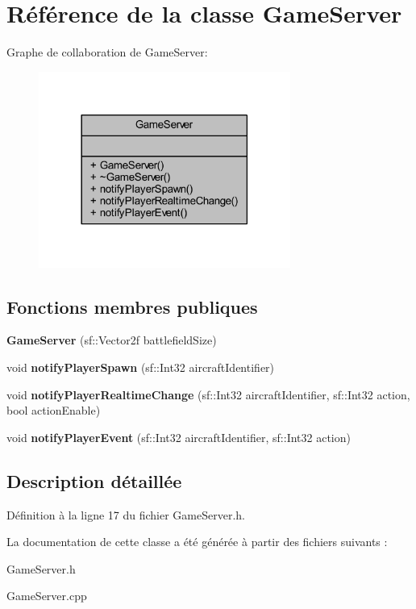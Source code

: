 \hypertarget{class_game_server}{}\section{Référence de la classe Game\+Server}
\label{class_game_server}


Graphe de collaboration de Game\+Server\+:\nopagebreak
\begin{figure}[H]
\begin{center}
\leavevmode
\includegraphics[width=234pt]{class_game_server__coll__graph}
\end{center}
\end{figure}
\subsection*{Fonctions membres publiques}
\begin{DoxyCompactItemize}
\item 
\hypertarget{class_game_server_a61393ed81464c44e95784b4c3f49f19c}{}\label{class_game_server_a61393ed81464c44e95784b4c3f49f19c} 
{\bfseries Game\+Server} (sf\+::\+Vector2f battlefield\+Size)
\item 
\hypertarget{class_game_server_a3a0a351ef8758c358f7e9cbdee82889c}{}\label{class_game_server_a3a0a351ef8758c358f7e9cbdee82889c} 
void {\bfseries notify\+Player\+Spawn} (sf\+::\+Int32 aircraft\+Identifier)
\item 
\hypertarget{class_game_server_ab785edd984324549e033677f35dd025e}{}\label{class_game_server_ab785edd984324549e033677f35dd025e} 
void {\bfseries notify\+Player\+Realtime\+Change} (sf\+::\+Int32 aircraft\+Identifier, sf\+::\+Int32 action, bool action\+Enable)
\item 
\hypertarget{class_game_server_add73992b0e7cb29ebbfc745a4f79155e}{}\label{class_game_server_add73992b0e7cb29ebbfc745a4f79155e} 
void {\bfseries notify\+Player\+Event} (sf\+::\+Int32 aircraft\+Identifier, sf\+::\+Int32 action)
\end{DoxyCompactItemize}


\subsection{Description détaillée}


Définition à la ligne 17 du fichier Game\+Server.\+h.



La documentation de cette classe a été générée à partir des fichiers suivants \+:\begin{DoxyCompactItemize}
\item 
Game\+Server.\+h\item 
Game\+Server.\+cpp\end{DoxyCompactItemize}
